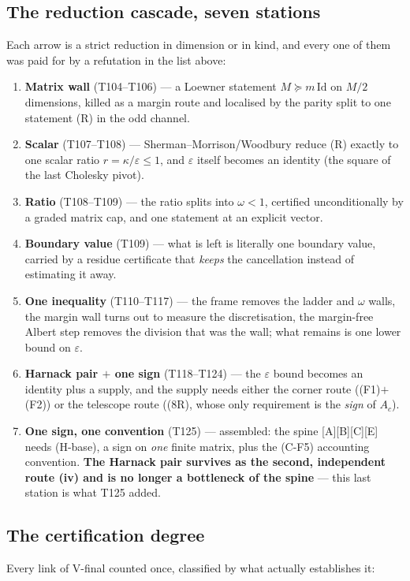 \documentclass[11pt,a4paper]{article}
\begin{document}
\subsection{The reduction cascade, seven stations}
Each arrow is a strict reduction in dimension or in kind, and every one of them was paid for by a
refutation in the list above:

\begin{enumerate}[leftmargin=1.9em,label=\textbf{\arabic*.}]
\item \textbf{Matrix wall} (T104--T106) --- a Loewner statement $M\succeq m\,\mathrm{Id}$ on $M/2$
dimensions, killed as a margin route and localised by the parity split to one statement (R) in the
odd channel.
\item \textbf{Scalar} (T107--T108) --- Sherman--Morrison/Woodbury reduce (R) exactly to one scalar
ratio $r=\kappa/\varepsilon\le1$, and $\varepsilon$ itself becomes an identity (the square of the
last Cholesky pivot).
\item \textbf{Ratio} (T108--T109) --- the ratio splits into $\omega<1$, certified unconditionally by
a graded matrix cap, and one statement at an explicit vector.
\item \textbf{Boundary value} (T109) --- what is left is literally one boundary value, carried by a
residue certificate that \emph{keeps} the cancellation instead of estimating it away.
\item \textbf{One inequality} (T110--T117) --- the frame removes the ladder and $\omega$ walls, the
margin wall turns out to measure the discretisation, the margin-free Albert step removes the
division that was the wall; what remains is one lower bound on $\varepsilon$.
\item \textbf{Harnack pair $+$ one sign} (T118--T124) --- the $\varepsilon$ bound becomes an identity
plus a supply, and the supply needs either the corner route ((F1)$+$(F2)) or the telescope route
((8R), whose only requirement is the \emph{sign} of $A_c$).
\item \textbf{One sign, one convention} (T125) --- assembled: the spine [A][B][C][E] needs (H-base),
a sign on \emph{one} finite matrix, plus the (C-F5) accounting convention. \textbf{The Harnack pair
survives as the second, independent route (iv) and is no longer a bottleneck of the spine} --- this
last station is what T125 added.
\end{enumerate}

\subsection{The certification degree}
Every link of V-final counted once, classified by what actually establishes it:
\end{document}
